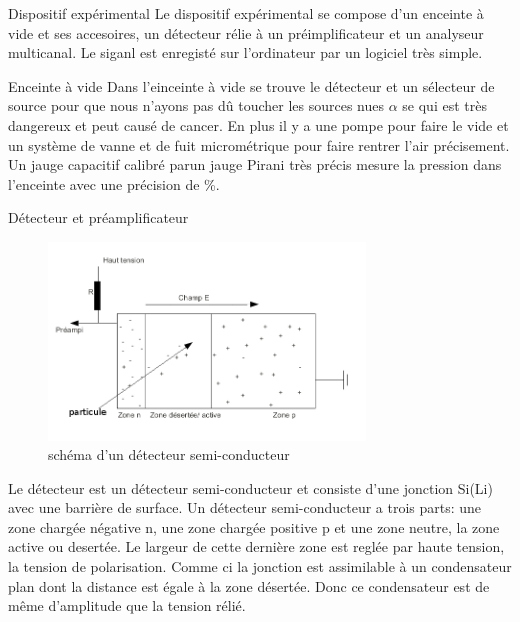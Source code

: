 \documentclass[a4paper,11pt]{scrartcl}
\begin{document}
 \begin{section}{Dispositif expérimental}
   Le dispositif expérimental se compose d'un enceinte à vide et ses accesoires, un détecteur rélie à un préimplificateur et un analyseur multicanal. Le siganl est enregisté sur l'ordinateur par un logiciel très simple.
   
   \begin{subsection}{Enceinte à vide}
    Dans l'einceinte à vide se trouve le détecteur et un sélecteur de source pour que nous n'ayons pas dû toucher les sources nues $\alpha$ se qui est très dangereux et peut causé de cancer. En plus il y a une pompe pour faire le vide et un système de vanne et de fuit micrométrique pour faire rentrer l'air précisement. Un jauge capacitif calibré parun jauge Pirani très précis mesure la pression dans l'enceinte avec une précision de \unit[0,2]{\%}.  
   \end{subsection}

   \begin{subsection}{Détecteur et préamplificateur}
    \begin{figure}[hbt]
     \begin{center}
      \includegraphics[width=0.75\textwidth]{Bilder/detecteur.png}
     \end{center}
     \caption{schéma d'un détecteur semi-conducteur}
    \end{figure}
    Le détecteur est un détecteur semi-conducteur et consiste d'une jonction Si(Li) avec une barrière de surface. Un détecteur semi-conducteur a trois parts: une zone chargée négative n, une zone chargée positive p  et une zone neutre, la zone active ou desertée. Le largeur de cette dernière zone est reglée par haute tension, la tension de polarisation. Comme ci la jonction est assimilable à un condensateur plan dont la distance est égale à la zone désertée. Donc ce condensateur est de même d'amplitude que la tension rélié.


\end{subsection}
\end{section}
\end{document}
